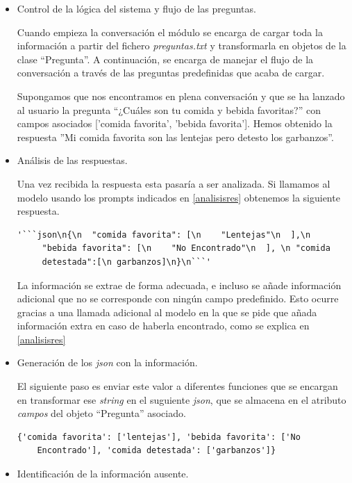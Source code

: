 \begin{itemize}
	\item Control de la lógica del sistema y flujo de las preguntas.
	
	 Cuando empieza la conversación el módulo se encarga de cargar toda la información a partir del fichero \textit{preguntas.txt} y transformarla en objetos de la clase ``Pregunta''. A continuación, se encarga de manejar el flujo de la conversación a través de las preguntas predefinidas que acaba de cargar.
	 
	 Supongamos que nos encontramos en plena conversación y que se ha lanzado al usuario la pregunta ``¿Cuáles son tu comida y bebida favoritas?'' con campos asociados ['comida favorita', 'bebida favorita']. Hemos obtenido la respuesta ''Mi comida favorita son las lentejas pero detesto los garbanzos''.
	
	\item Análisis de las respuestas.
	
	 Una vez recibida la respuesta esta pasaría a ser analizada. Si llamamos al modelo usando los prompts indicados en \ref{analisisres} obtenemos la siguiente respuesta. 
\begin{verbatim}
'```json\n{\n  "comida favorita": [\n    "Lentejas"\n  ],\n 
	 "bebida favorita": [\n    "No Encontrado"\n  ], \n "comida 
	 detestada":[\n garbanzos]\n}\n```'
\end{verbatim}

La información se extrae de forma adecuada, e incluso se añade información adicional que no se corresponde con ningún campo predefinido. Esto ocurre gracias a una llamada adicional al modelo en la que se pide que añada información extra en caso de haberla encontrado, como se explica en \ref{analisisres}

	\item Generación de los \textit{json} con la información.

El siguiente paso es enviar este valor a diferentes funciones que se encargan en transformar ese \textit{string} en el suguiente \textit{json}, que se almacena en el atributo \textit{campos} del objeto ``Pregunta'' asociado. 
\begin{verbatim}
{'comida favorita': ['lentejas'], 'bebida favorita': ['No 
	Encontrado'], 'comida detestada': ['garbanzos']}
\end{verbatim}

	\item Identificación de la información ausente.
	

\end{itemize}
